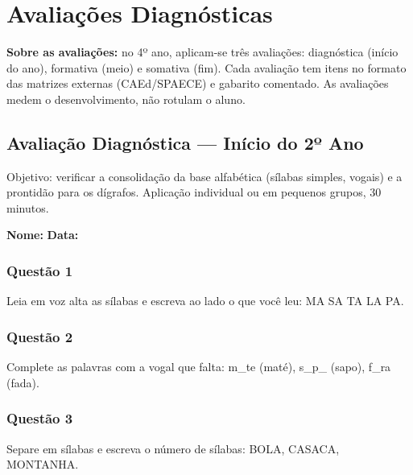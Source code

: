 
\chapter{Avaliações Diagnósticas}

\textbf{Sobre as avaliações:} no 4º ano, aplicam-se três avaliações: diagnóstica (início do ano), formativa (meio) e somativa (fim). Cada avaliação tem itens no formato das matrizes externas (CAEd/SPAECE) e gabarito comentado. As avaliações medem o desenvolvimento, não rotulam o aluno.

\section{Avaliação Diagnóstica — Início do 2º Ano}

\begin{avaliacao}
Objetivo: verificar a consolidação da base alfabética (sílabas simples, vogais) e a prontidão para os dígrafos. Aplicação individual ou em pequenos grupos, 30 minutos.
\end{avaliacao}

\noindent\textbf{Nome:} \underline{\hspace{4cm}} \quad \textbf{Data:} \underline{\hspace{2cm}}

\subsection*{Questão 1}
Leia em voz alta as sílabas e escreva ao lado o que você leu: MA  SA  TA  LA  PA.

\begin{center}
  \underline{\hspace{12cm}}
\end{center}

\subsection*{Questão 2}
Complete as palavras com a vogal que falta: m\_te (maté), s\_p\_ (sapo), f\_ra (fada).

\begin{center}
  \underline{\hspace{12cm}}
\end{center}

\subsection*{Questão 3}
Separe em sílabas e escreva o número de sílabas: BOLA, CASACA, MONTANHA.

